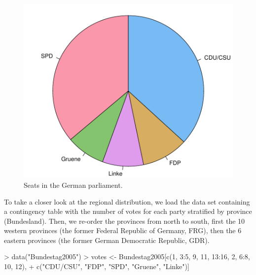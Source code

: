 \documentclass{Z}
\begin{document}
\begin{figure}[p]
\begin{center}
\includegraphics{hcl-colors-seats1}
\caption{\label{fig:seats} Seats in the German parliament.}
\end{center}
\end{figure}

To take a closer look at the regional distribution, we load the 
data set containing a contingency table with the number of votes for each party
stratified by province (Bundesland). Then, we re-order the provinces from 
north to south, first the 10 western provinces (the former Federal Republic of Germany, FRG),
then the 6 eastern provinces (the former German Democratic Republic, GDR). 
\begin{Schunk}
\begin{Sinput}
> data("Bundestag2005")
> votes <- Bundestag2005[c(1, 3:5, 9, 11, 13:16, 2, 6:8, 10, 12), 
+     c("CDU/CSU", "FDP", "SPD", "Gruene", "Linke")]
\end{Sinput}
\end{Schunk}
\end{document}
